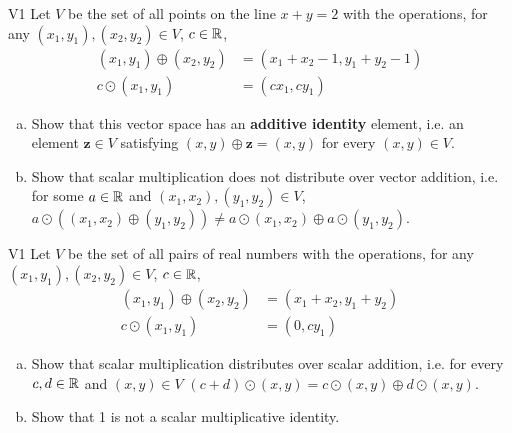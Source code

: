 \begin{problem}{V1}
Let $V$ be the set of all points on the line $x+y=2$ with the operations, for any $(x_1,y_1), (x_2,y_2) \in V$, $c \in \mathbb{R}$,
\begin{align*}
(x_1,y_1) \oplus (x_2,y_2) &= (x_1+x_2-1,y_1+y_2-1) \\
c \odot (x_1,y_1) &= (cx_1, cy_1)
\end{align*}
\begin{enumerate}[(a)]
\item Show that this vector space has an \textbf{additive identity} element, i.e. an element
      \(\mathbf{z} \in V\) satisfying \((x,y)\oplus\mathbf{z}=(x,y)\) for every \((x,y) \in V\).
\item Show that scalar multiplication does not distribute over vector addition, i.e. for some \(a \in \mathbb{R}\) and \( (x_1,x_2), (y_1,y_2) \in V\), \(a \odot \left( (x_1,x_2)\oplus (y_1,y_2) \right) \neq a \odot (x_1,x_2) \oplus a \odot (y_1,y_2) \).
\end{enumerate}
\end{problem}
\begin{solution}
\end{solution}

\begin{problem}{V1}
Let $V$ be the set of all pairs of real numbers with the operations, for any $(x_1,y_1), (x_2,y_2) \in V$, $c \in \mathbb{R}$,
\begin{align*}
(x_1,y_1) \oplus (x_2,y_2) &= (x_1+x_2,y_1+y_2) \\
c \odot (x_1,y_1) &= (0, cy_1)
\end{align*}
\begin{enumerate}[(a)]
\item Show that scalar multiplication
      distributes over scalar addition, i.e. for every \(c,d \in \mathbb{R}\) and \( (x,y) \in V\)
      \((c+d)\odot(x,y)=
      c\odot(x,y) \oplus d\odot(x,y)\).
\item Show that 1 is not a scalar multiplicative identity.
\end{enumerate}
\end{problem}
\begin{solution}
\end{solution}


